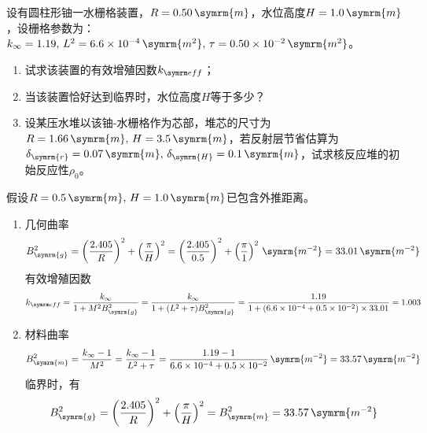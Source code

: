 \begin{exercise}
    设有圆柱形铀一水栅格装置，$R = 0.50\,\symrm{m}$，水位高度$H = 1.0\,\symrm{m}$，设栅格参数为：$k_{\infty} = 1.19,\,L^2 = 6.6\times 10^{-4}\,\symrm{m^2},\,\tau = 0.50\times 10^{-2}\,\symrm{m^2}$。
    \begin{enumerate}[(1)]
        \item 试求该装置的有效增殖因数$\keff$；
        \item 当该装置恰好达到临界时，水位高度$H$等于多少？
        \item 设某压水堆以该铀-水栅格作为芯部，堆芯的尺寸为$R = 1.66\,\symrm{m},\,H = 3.5\,\symrm{m}$，若反射层节省估算为$\delta_{\symrm{r}} = 0.07\,\symrm{m},\,\delta_{\symrm{H}} = 0.1\,\symrm{m}$，试求核反应堆的初始反应性$\rho_0$。
    \end{enumerate}
    \begin{solution}
        假设$R=0.5\,\symrm{m},\,H=1.0\,\symrm{m}$已包含外推距离。
        \begin{enumerate}[(1)]
            \item 几何曲率
            \begin{equation*}
                B_{\symrm{g}}^2 = \left(\frac{2.405}{R}\right)^2 + \left(\frac{\pi}{H}\right)^2 = \left(\frac{2.405}{0.5}\right)^2 + \left(\frac{\pi}{1}\right)^2\,\symrm{m^{-2}} = 33.01\,\symrm{m^{-2}}
            \end{equation*}
            有效增殖因数
            \begin{equation*}
                \keff = \frac{k_{\infty}}{1 + M^2 B_{\symrm{g}}^2} = \frac{k_{\infty}}{1 + (L^2 + \tau) B_{\symrm{g}}^2} = \frac{1.19}{1 + (6.6\times 10^{-4} + 0.5\times 10^{-2}) \times 33.01} = 1.003
            \end{equation*}
            \item 材料曲率
            \begin{equation*}
                B_{\symrm{m}}^2 = \frac{k_{\infty} - 1}{M^2} = \frac{k_{\infty} - 1}{L^2 + \tau} = \frac{1.19 - 1}{6.6\times 10^{-4} + 0.5\times 10^{-2}}\,\symrm{m^{-2}} = 33.57\,\symrm{m^{-2}}
            \end{equation*}
            临界时，有
            \begin{equation*}
                B_{\symrm{g}}^2 = \left(\frac{2.405}{R}\right)^2 + \left(\frac{\pi}{H}\right)^2 = B_{\symrm{m}}^2 = 33.57\,\symrm{m^{-2}}
            \end{equation*}
            

\end{enumerate}
\end{solution}
\end{exercise}
